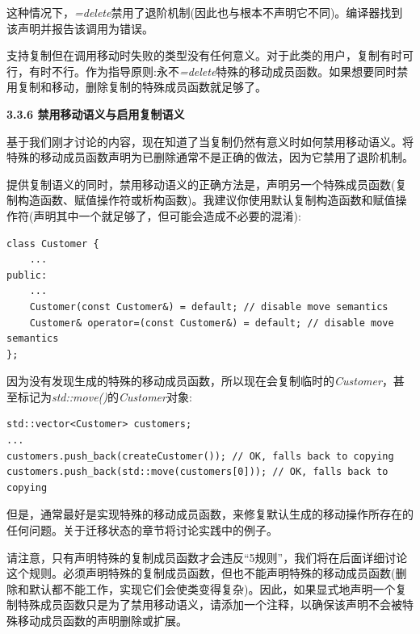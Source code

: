 这种情况下，\textit{=delete}禁用了退阶机制(因此也与根本不声明它不同)。编译器找到该声明并报告该调用为错误。\par

支持复制但在调用移动时失败的类型没有任何意义。对于此类的用户，复制有时可行，有时不行。作为指导原则:永不\textit{=delete}特殊的移动成员函数。如果想要同时禁用复制和移动，删除复制的特殊成员函数就足够了。\par

\hspace*{\fill} \par %
\textbf{3.3.6 禁用移动语义与启用复制语义}

基于我们刚才讨论的内容，现在知道了当复制仍然有意义时如何禁用移动语义。将特殊的移动成员函数声明为已删除通常不是正确的做法，因为它禁用了退阶机制。\par

提供复制语义的同时，禁用移动语义的正确方法是，声明另一个特殊成员函数(复制构造函数、赋值操作符或析构函数)。我建议你使用默认复制构造函数和赋值操作符(声明其中一个就足够了，但可能会造成不必要的混淆):\par

\begin{lstlisting}[caption={}]
class Customer {
	...
public:
	...
	Customer(const Customer&) = default; // disable move semantics
	Customer& operator=(const Customer&) = default; // disable move semantics
};
\end{lstlisting}

因为没有发现生成的特殊的移动成员函数，所以现在会复制临时的\textit{Customer}，甚至标记为\textit{std::move()}的\textit{Customer}对象:\par

\begin{lstlisting}[caption={}]
std::vector<Customer> customers;
...
customers.push_back(createCustomer()); // OK, falls back to copying
customers.push_back(std::move(customers[0])); // OK, falls back to copying
\end{lstlisting}

但是，通常最好是实现特殊的移动成员函数，来修复默认生成的移动操作所存在的任何问题。关于迁移状态的章节将讨论实践中的例子。\par

请注意，只有声明特殊的复制成员函数才会违反“5规则”，我们将在后面详细讨论这个规则。必须声明特殊的复制成员函数，但也不能声明特殊的移动成员函数(删除和默认都不能工作，实现它们会使类变得复杂)。因此，如果显式地声明一个复制特殊成员函数只是为了禁用移动语义，请添加一个注释，以确保该声明不会被特殊移动成员函数的声明删除或扩展。\par

